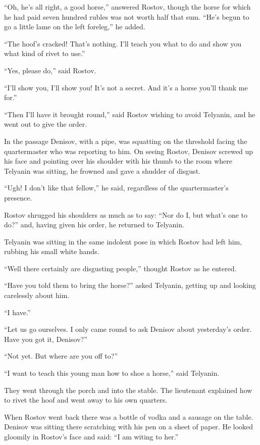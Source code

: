``Oh, he's all right, a good horse,'' answered Rostov, though the
horse for which he had paid seven hundred rubles was not worth
half that sum.  ``He's begun to go a little lame on the left
foreleg,'' he added.

``The hoof's cracked! That's nothing. I'll teach you what to do
and show you what kind of rivet to use.''

``Yes, please do,'' said Rostov.

``I'll show you, I'll show you! It's not a secret. And it's a
horse you'll thank me for.''

``Then I'll have it brought round,'' said Rostov wishing to avoid
Telyanin, and he went out to give the order.

In the passage Denisov, with a pipe, was squatting on the
threshold facing the quartermaster who was reporting to him. On
seeing Rostov, Denisov screwed up his face and pointing over his
shoulder with his thumb to the room where Telyanin was sitting,
he frowned and gave a shudder of disgust.

``Ugh! I don't like that fellow,'' he said, regardless of the
quartermaster's presence.

Rostov shrugged his shoulders as much as to say: ``Nor do I, but
what's one to do?'' and, having given his order, he returned to
Telyanin.

Telyanin was sitting in the same indolent pose in which Rostov
had left him, rubbing his small white hands.

``Well there certainly are disgusting people,'' thought Rostov as
he entered.

``Have you told them to bring the horse?'' asked Telyanin,
getting up and looking carelessly about him.

``I have.''

``Let us go ourselves. I only came round to ask Denisov about
yesterday's order. Have you got it, Denisov?''

``Not yet. But where are you off to?''

``I want to teach this young man how to shoe a horse,'' said
Telyanin.

They went through the porch and into the stable. The lieutenant
explained how to rivet the hoof and went away to his own
quarters.

When Rostov went back there was a bottle of vodka and a sausage
on the table. Denisov was sitting there scratching with his pen
on a sheet of paper. He looked gloomily in Rostov's face and
said: ``I am witing to her.''

